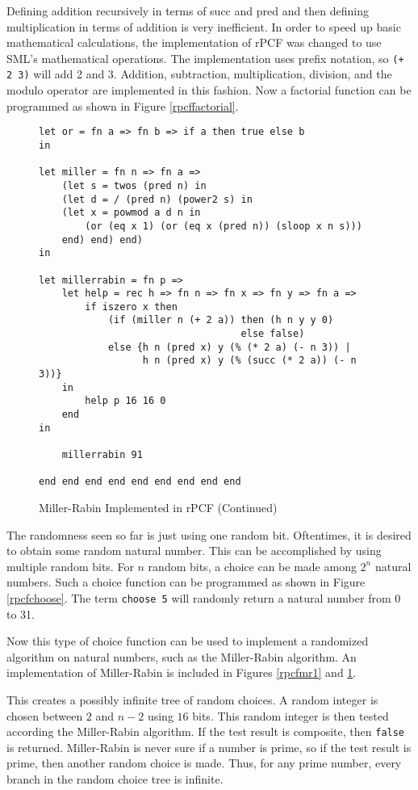 Defining addition recursively in terms of succ and pred and then defining multiplication in terms of addition is very inefficient.  In order to speed up basic mathematical calculations, the implementation of rPCF was changed to use SML's mathematical operations.  The implementation uses prefix notation, so \texttt{(+ 2 3)} will add 2 and 3.  Addition, subtraction, multiplication, division, and the modulo operator are implemented in this fashion.  Now a factorial function can be programmed as shown in Figure \ref{rpcffactorial}.

\begin{figure}
\begin{lstlisting}[language=rPCF]
let or = fn a => fn b => if a then true else b
in
	
let miller = fn n => fn a =>
    (let s = twos (pred n) in 
    (let d = / (pred n) (power2 s) in 
    (let x = powmod a d n in 
        (or (eq x 1) (or (eq x (pred n)) (sloop x n s))) 
    end) end) end)
in

let millerrabin = fn p => 
    let help = rec h => fn n => fn x => fn y => fn a => 
        if iszero x then 
            (if (miller n (+ 2 a)) then (h n y y 0) 
                                   else false) 
            else {h n (pred x) y (% (* 2 a) (- n 3)) | 
                  h n (pred x) y (% (succ (* 2 a)) (- n 3))}
    in
        help p 16 16 0
    end
in

    millerrabin 91

end end end end end end end end end
\end{lstlisting}
\caption{Miller-Rabin Implemented in rPCF (Continued)} \label{rpcfmr2}
\end{figure}

The randomness seen so far is just using one random bit.  Oftentimes, it is desired to obtain some random natural number.  This can be accomplished by using multiple random bits.  For $n$ random bits, a choice can be made among $2^{n}$ natural numbers.  Such a choice function can be programmed as shown in Figure \ref{rpcfchoose}.
The term \texttt{choose 5} will randomly return a natural number from 0 to 31.   

Now this type of choice function can be used to implement a randomized algorithm on natural numbers, such as the Miller-Rabin algorithm.  An implementation of Miller-Rabin is included in Figures \ref{rpcfmr1} and \ref{rpcfmr2}.

This creates a possibly infinite tree of random choices.  A random integer is chosen between $2$ and $n-2$ using $16$ bits.  This random integer is then tested according the Miller-Rabin algorithm.  If the test result is composite, then \texttt{false} is returned.  Miller-Rabin is never sure if a number is prime, so if the test result is prime, then another random choice is made.  Thus, for any prime number, every branch in the random choice tree is infinite. 

